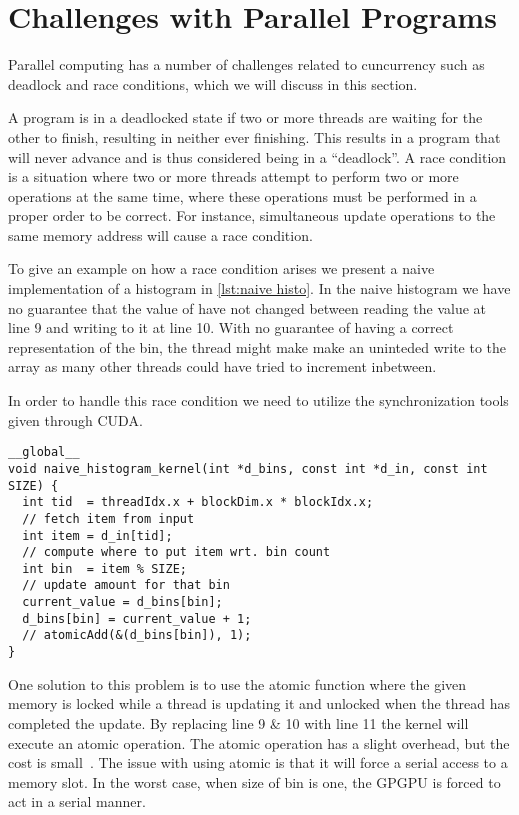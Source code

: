 \section{Challenges with Parallel Programs}
\label{sec:challenges with parallel programs}
Parallel computing has a number of challenges related to cuncurrency such as deadlock and race conditions, which we will discuss in this section.

A program is in a deadlocked state if two or more threads are waiting for the other to finish, resulting in neither ever finishing.
This results in a program that will never advance and is thus considered being in a ``deadlock''.
A race condition is a situation where two or more threads attempt to perform two or more operations at the same time, where these operations must be performed in a proper order to be correct.
For instance, simultaneous update operations to the same memory address will cause a race condition.~\cite{farber2011cuda}

To give an example on how a race condition arises we present a naive implementation of a histogram in \cref{lst:naive histo}.
In the naive histogram we have no guarantee that the value of  have not changed between reading the value at line 9 and writing to it at line 10.
With no guarantee of having a correct representation of the bin, the thread might make make an uninteded write to the array as many other threads could have tried to increment inbetween.

In order to handle this race condition we need to utilize the synchronization tools given through CUDA.

\begin{lstlisting}[caption={Naive histogram implementation with race condition}, label={lst:naive histo}]
__global__
void naive_histogram_kernel(int *d_bins, const int *d_in, const int SIZE) {
  int tid  = threadIdx.x + blockDim.x * blockIdx.x;
  // fetch item from input
  int item = d_in[tid];
  // compute where to put item wrt. bin count
  int bin  = item % SIZE;
  // update amount for that bin
  current_value = d_bins[bin];
  d_bins[bin] = current_value + 1;
  // atomicAdd(&(d_bins[bin]), 1);
}
\end{lstlisting}

One solution to this problem is to use the atomic function where the given memory is locked while a thread is updating it and unlocked when the thread has completed the update.
By replacing line 9 \& 10 with line 11 the kernel will execute an atomic operation.
The atomic operation has a slight overhead, but the cost is small~\cite{udacity}.
The issue with using atomic is that it will force a serial access to a memory slot.
In the worst case, when size of bin is one, the GPGPU is forced to act in a serial manner.
